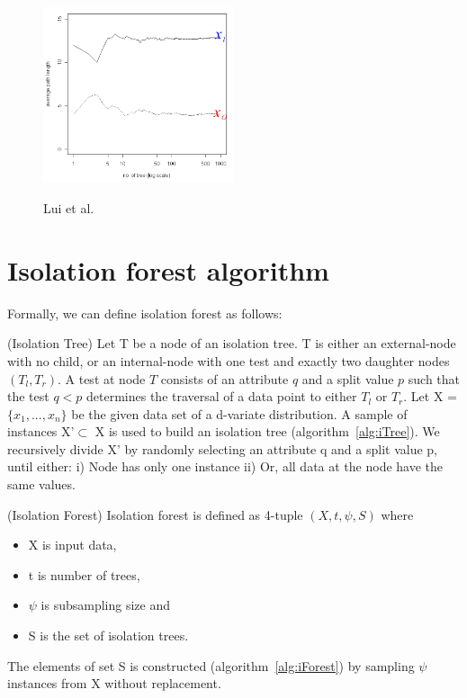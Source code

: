 \vspace{1em}
\begin{figure}[!ht]
    \label{fig:path-length}
    \centering
    \includegraphics[width=0.50\textwidth]{../fig/chapter2/path-length-for-that-point.png}
    
    {Lui et al. \cite{10.1145/2133360.2133363}}
\end{figure}

\section{Isolation forest algorithm}
\label{sec:iforest-algorithm}

Formally, we can define isolation forest as follows:

\begin{defn}
    \label{defn:isolation-tree}
    (Isolation Tree)
    Let T be a node of an isolation tree.
    T is either an external-node with no child, or an internal-node with one test and exactly two daughter nodes $(T_l, T_r)$.
    A test at node $T$ consists of an attribute $q$ and a split value $p$ such that the test $q < p$ determines the traversal of a data point to either $T_l$ or $T_r$.
    Let X = $\{x_1, ..., x_n\}$ be the given data set of a d-variate distribution.
    A sample of instances X'$\subset$ X is used to build an isolation tree (algorithm~\ref{alg:iTree}).
    We recursively divide X' by randomly selecting an attribute q and a split value p, until either: i) Node has only one instance ii) Or, all data at the node have the same values.
\end{defn}


\begin{defn}
    \label{defn:isolation-forest}
    (Isolation Forest)
    Isolation forest is defined as 4-tuple $(X, t, \psi, S)$ where
    \vspace{-1em}
    \begin{itemize}
        \setlength\itemsep{-1em}
        \item X is input data,
        \item t is number of trees,
        \item $\psi$ is subsampling size and
        \item S is the set of isolation trees.
    \end{itemize}
    \vspace{-1em}
    The elements of set S is constructed (algorithm~\ref{alg:iForest}) by sampling $\psi$ instances from X without replacement.
\end{defn}

